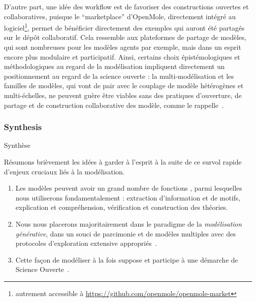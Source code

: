 \bpar{}
{
D'autre part, une idée des workflow est de favoriser des constructions ouvertes et collaboratives, puisque le ``marketplace'' d'OpenMole, directement intégré au logiciel\footnote{autrement accessible à \url{https://github.com/openmole/openmole-market}}, permet de bénéficier directement des exemples qui auront été partagés sur le dépôt collaboratif. Cela ressemble aux plateformes de partage de modèles, qui sont nombreuses pour les modèles agents par exemple, mais dans un esprit encore plus modulaire et participatif. Ainsi, certains choix épistémologiques et méthodologiques au regard de la modélisation impliquent directement un positionnement au regard de la science ouverte : la multi-modélisation et les familles de modèles, qui vont de pair avec le couplage de modèle hétérogènes et multi-échelles, ne peuvent guère être viables sans des pratiques d'ouverture, de partage et de construction collaborative des modèle, comme le rappelle~\cite{banos2013pour}.
}





\subsubsection{Synthesis}{Synthèse}

Résumons brièvement les idées à garder à l'esprit à la suite de ce survol rapide d'enjeux cruciaux liés à la modélisation.
\begin{enumerate}
	\item Les modèles peuvent avoir un grand nombre de fonctions \cite{varenne2017theories}, parmi lesquelles nous utiliserons fondamentalement : extraction d'information et de motifs, explication et compréhension, vérification et construction des théories.
	\item Nous nous placerons majoritairement dans le paradigme de la \emph{modélisation générative}, dans un souci de parcimonie et de modèles multiples avec des protocoles d'exploration extensive appropriés~\cite{pumain2017urban}.
	\item Cette façon de modéliser à la fois suppose et participe à une démarche de Science Ouverte~\cite{fecher2014open}.
\end{enumerate}

